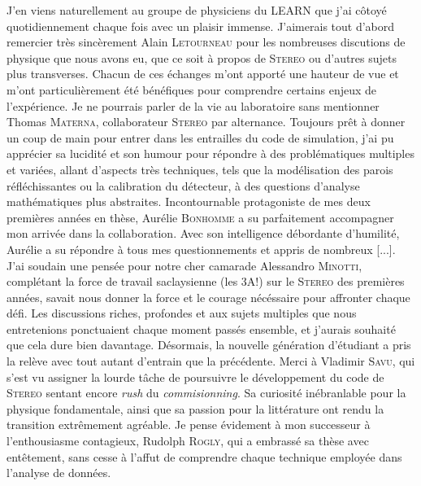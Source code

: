 J'en viens naturellement au groupe de physiciens du LEARN que j'ai côtoyé quotidiennement chaque fois avec un plaisir immense. J'aimerais tout d'abord remercier très sincèrement Alain \textsc{Letourneau} pour les nombreuses discutions de physique que nous avons eu, que ce soit à propos de \textsc{Stereo} ou d'autres sujets plus transverses. Chacun de ces échanges m'ont apporté une hauteur de vue et m'ont particulièrement été bénéfiques pour comprendre certains enjeux de l'expérience. Je ne pourrais parler de la vie au laboratoire sans mentionner Thomas \textsc{Materna}, collaborateur \textsc{Stereo} par alternance. Toujours prêt à donner un coup de main pour entrer dans les entrailles du code de simulation, j'ai pu apprécier sa lucidité et son humour pour répondre à des problématiques multiples et variées, allant d'aspects très techniques, tels que la modélisation des parois réfléchissantes ou la calibration du détecteur, à des questions d'analyse mathématiques plus abstraites. Incontournable protagoniste de mes deux premières années en thèse, Aurélie \textsc{Bonhomme} a su parfaitement accompagner mon arrivée dans la collaboration. Avec son intelligence débordante d'humilité, Aurélie a su répondre à tous mes questionnements et appris de nombreux [...]. J'ai soudain une pensée pour notre cher camarade Alessandro \textsc{Minotti}, complétant la force de travail saclaysienne (les 3A!) sur le \textsc{Stereo} des premières années, savait nous donner la force et le courage nécéssaire pour affronter chaque défi. Les discussions riches, profondes et aux sujets multiples que nous entretenions ponctuaient chaque moment passés ensemble, et j'aurais souhaité que cela dure bien davantage. Désormais, la nouvelle génération d'étudiant a pris la relève avec tout autant d'entrain que la précédente. Merci à Vladimir \textsc{Savu}, qui s'est vu assigner la lourde tâche de poursuivre le développement du code de \textsc{Stereo} sentant encore \textit{rush} du \textit{commisionning}. Sa curiosité inébranlable pour la physique fondamentale, ainsi que sa passion pour la littérature ont rendu la transition extrêmement agréable. Je pense évidement à mon successeur à l'enthousiasme contagieux, Rudolph \textsc{Rogly}, qui a embrassé sa thèse avec entêtement, sans cesse à l'affut de comprendre chaque technique employée dans l'analyse de données.\\

